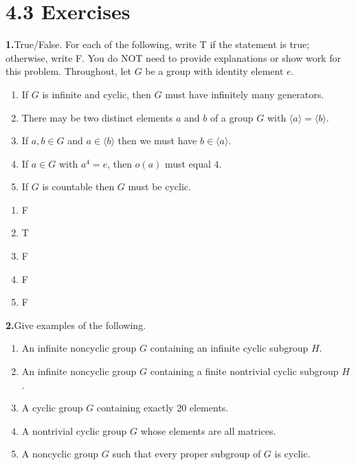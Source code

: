 \documentclass[10pt,]{book}
\theoremstyle{plain}
\theoremstyle{definition}
\theoremstyle{definition}
\theoremstyle{definition}
\theoremstyle{definition}
\numberwithin{equation}{section}
\begin{document}
\section*{4.3 Exercises}
\noindent\textbf{1.}\quad{}True/False. For each of the following, write T if the statement is true; otherwise, write F. You do NOT need to provide explanations or show work for this problem. Throughout, let \(G\) be a group with identity element \(e\). \leavevmode%
\begin{enumerate}[label=(\alph*)]
\item\hypertarget{li-203}{}If \(G\) is infinite and cyclic, then \(G\) must have infinitely many generators.%
\item\hypertarget{li-204}{}There may be two distinct elements \(a\) and \(b\) of a group \(G\) with \(\langle a\rangle =\langle b\rangle\).%
\item\hypertarget{li-205}{}If \(a,b\in G\) and \(a\in \langle b\rangle\) then we must have \(b\in \langle a\rangle\).%
\item\hypertarget{li-206}{}If \(a\in G\) with \(a^4=e\), then \(o(a)\) must equal \(4\).%
\item\hypertarget{li-207}{}If \(G\) is countable then \(G\) must be cyclic.%
\end{enumerate}
%
\par\smallskip
\leavevmode%
\begin{multicols}{5}
\begin{enumerate}[label=(\alph*)]
\item\hypertarget{li-208}{}F%
\item\hypertarget{li-209}{}T%
\item\hypertarget{li-210}{}F%
\item\hypertarget{li-211}{}F%
\item\hypertarget{li-212}{}F%
\end{enumerate}
\end{multicols}
\par\smallskip
\noindent\textbf{2.}\quad{}Give examples of the following. \leavevmode%
\begin{enumerate}[label=(\alph*)]
\item\hypertarget{li-213}{}An infinite noncyclic group \(G\) containing an infinite cyclic subgroup \(H\).%
\item\hypertarget{li-214}{}An infinite noncyclic group \(G\) containing a finite nontrivial cyclic subgroup \(H\).%
\item\hypertarget{li-215}{}A cyclic group \(G\) containing exactly 20 elements.%
\item\hypertarget{li-216}{}A nontrivial cyclic group \(G\) whose elements are all matrices.%
\item\hypertarget{li-217}{}A noncyclic group \(G\) such that every proper subgroup of \(G\) is cyclic.%
\end{enumerate}
\end{document}
